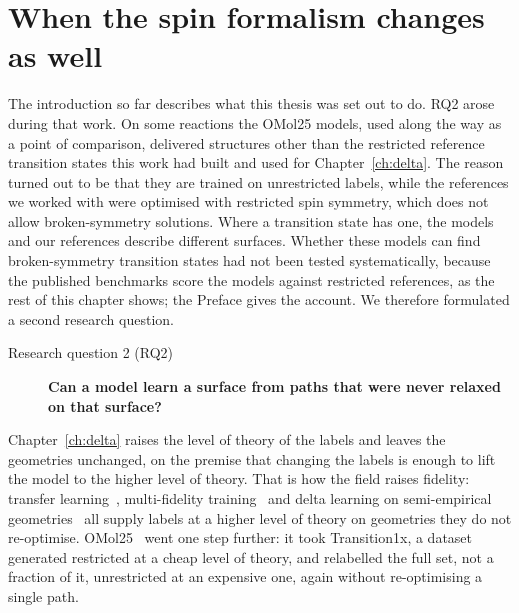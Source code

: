 \section{When the spin formalism changes as well}

The introduction so far describes what this thesis was set out to do.
RQ2 arose during that work. On some reactions the OMol25 models, used
along the way as a point of comparison, delivered structures other than
the restricted reference transition states this work had built and used
for Chapter~\ref{ch:delta}. The reason turned out to be that they are trained on
unrestricted labels, while the references we worked with were
optimised with restricted spin symmetry, which does not allow
broken-symmetry solutions. Where a transition state has one, the models
and our references describe different surfaces. Whether these models
can find broken-symmetry transition states had not been tested
systematically, because the published benchmarks score the models
against restricted references, as the rest of this chapter shows; the
Preface gives the account. We therefore formulated a second research
question.

\noindent
\begin{minipage}{\linewidth}
\begin{description}
  \item[Research question 2 (RQ2)] \textbf{Can a model learn a surface from
    paths that were never relaxed on that surface?}
\end{description}
\end{minipage}

Chapter~\ref{ch:delta} raises the level of theory of the labels and
leaves the geometries unchanged, on the premise that changing the labels is
enough to lift the model to the higher level of theory. That is how the field raises fidelity: transfer
learning~\cite{smith2019ani1ccx}, multi-fidelity
training~\cite{messerly2025} and delta learning on semi-empirical
geometries~\cite{ren2026} all
supply labels at a higher level of theory on geometries they do not
re-optimise. OMol25~\cite{omol25} went one step further: it took
Transition1x, a dataset generated restricted at a cheap level of
theory, and relabelled the full set, not a fraction of it,
unrestricted at an expensive one, again without re-optimising a single
path.

